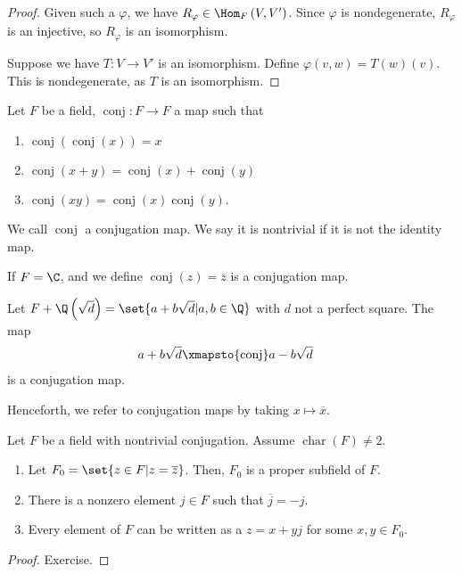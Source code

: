 \documentclass[10pt]{mypackage}
\DeclareMathOperator{\conj}{conj}
\begin{document}
  \begin{proof}
    Given such a $\varphi$, we have $R_{\varphi}\in \Hom_{F}\left(V,V'\right)$. Since $\varphi$ is nondegenerate, $R_{\varphi}$ is an injective, so $R_{\varphi}$ is an isomorphism.\newline

    Suppose we have $T: V\rightarrow V'$ is an isomorphism. Define $\varphi\left(v,w\right) = T(w)(v)$. This is nondegenerate, as $T$ is an isomorphism.
  \end{proof}
  \begin{definition}[Conjugation]
    Let $F$ be a field, $\conj: F\rightarrow F$ a map such that
    \begin{enumerate}[(1)]
      \item $\conj\left(\conj\left(x\right)\right) = x$
      \item $\conj\left(x+y\right) = \conj\left(x\right) + \conj\left(y\right)$
      \item $\conj\left(xy\right) = \conj\left(x\right)\conj\left(y\right)$.
    \end{enumerate}
    We call $\conj$ a conjugation map. We say it is nontrivial if it is not the identity map.
  \end{definition}
  \begin{example}
    If $F = \C$, and we define $\conj\left(z\right) = \overline{z}$ is a conjugation map.
  \end{example}
  \begin{example}
    Let $F + \Q\left(\sqrt{d}\right) = \set{a + b\sqrt{d} | a,b\in \Q}$ with $d$ not a perfect square. The map
    \begin{align*}
      a + b\sqrt{d} &\xmapsto{\conj} a-b\sqrt{d}
    \end{align*}
    is a conjugation map.
  \end{example}
  Henceforth, we refer to conjugation maps by taking $x \mapsto \overline{x}$.
  \begin{lemma}
    Let $F$ be a field with nontrivial conjugation. Assume $\operatorname{char}\left(F\right) \neq 2$.
    \begin{enumerate}[(1)]
      \item Let $F_0 = \set{z\in F | z = \overline{z}}$. Then, $F_0$ is a proper subfield of $F$.
      \item There is a nonzero element $j\in F$ such that $\overline{j} = -j$.
      \item Every element of $F$ can be written as a $z = x + yj$ for some $x,y\in F_0$.
    \end{enumerate}
  \end{lemma}
  \begin{proof}
    Exercise.
  \end{proof}
  
\end{document}
